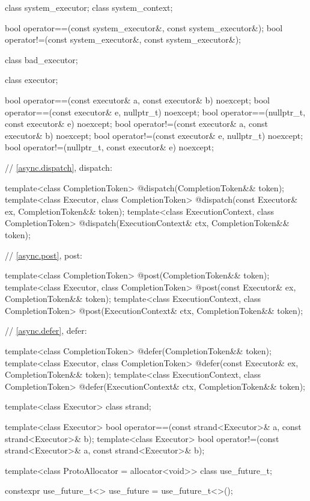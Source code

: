 \begin{codeblock}
{{{{  class system_executor;
  class system_context;

  bool operator==(const system_executor&, const system_executor&);
  bool operator!=(const system_executor&, const system_executor&);

  class bad_executor;

  class executor;

  bool operator==(const executor& a, const executor& b) noexcept;
  bool operator==(const executor& e, nullptr_t) noexcept;
  bool operator==(nullptr_t, const executor& e) noexcept;
  bool operator!=(const executor& a, const executor& b) noexcept;
  bool operator!=(const executor& e, nullptr_t) noexcept;
  bool operator!=(nullptr_t, const executor& e) noexcept;

  // \ref{async.dispatch}, dispatch:

  template<class CompletionToken>
    @\DEDUCED@ dispatch(CompletionToken&& token);
  template<class Executor, class CompletionToken>
    @\DEDUCED@ dispatch(const Executor& ex, CompletionToken&& token);
  template<class ExecutionContext, class CompletionToken>
    @\DEDUCED@ dispatch(ExecutionContext& ctx, CompletionToken&& token);

  // \ref{async.post}, post:

  template<class CompletionToken>
    @\DEDUCED@ post(CompletionToken&& token);
  template<class Executor, class CompletionToken>
    @\DEDUCED@ post(const Executor& ex, CompletionToken&& token);
  template<class ExecutionContext, class CompletionToken>
    @\DEDUCED@ post(ExecutionContext& ctx, CompletionToken&& token);

  // \ref{async.defer}, defer:

  template<class CompletionToken>
    @\DEDUCED@ defer(CompletionToken&& token);
  template<class Executor, class CompletionToken>
    @\DEDUCED@ defer(const Executor& ex, CompletionToken&& token);
  template<class ExecutionContext, class CompletionToken>
    @\DEDUCED@ defer(ExecutionContext& ctx, CompletionToken&& token);

  template<class Executor>
    class strand;

  template<class Executor>
    bool operator==(const strand<Executor>& a, const strand<Executor>& b);
  template<class Executor>
    bool operator!=(const strand<Executor>& a, const strand<Executor>& b);

  template<class ProtoAllocator = allocator<void>>
    class use_future_t;

  constexpr use_future_t<> use_future = use_future_t<>();

}}}}
\end{codeblock}
